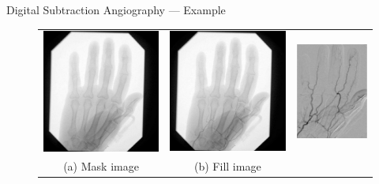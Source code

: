 \begin{frame}[c]{Digital Subtraction Angiography --- Example}
    \begin{figure}[tb]%
        \centering
        \begin{tabular}{ccc}
            \includegraphics[height=.3\linewidth]{images/dsa_mask.pdf} & \includegraphics[height=.3\linewidth]{images/dsa_fill.pdf} & \includegraphics[height=.3\linewidth]{images/dsa_diff.pdf} \\
            {\color{faublue}(a) Mask image}                                               & {\color{faublue}(b) Fill image}                                               & {\color{faublue}{(c) Angiogram}}                                              \\
        \end{tabular}

\end{figure}
\end{frame}
